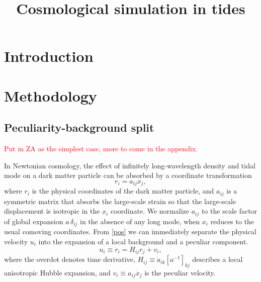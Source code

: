 \documentclass[a4paper,11pt]{article}
\title{Cosmological simulation in tides}
\newcommand{\HL}[1]{\textcolor{red}{#1}} %
\begin{document}
\maketitle

\section{Introduction}
\label{sec:intro}


\section{Methodology}
\label{sec:methodology}

\subsection{Peculiarity-background split}
\label{sub:split}

\HL{Put in ZA as the simplest case, more to come in the appendix.}

In Newtonian cosmology, the effect of infinitely long-wavelength density and
tidal mode on a dark matter particle can be absorbed by a coordinate
transformation
\begin{equation}
    r_i = a_{ij} x_j,
    \label{pos}
\end{equation}
where $r_i$ is the physical coordinates of the dark matter particle, and
$a_{ij}$ is a symmetric matrix that absorbs the large-scale strain so that the
large-scale displacement is isotropic in the $x_i$ coordinate.
We normalize $a_{ij}$ to the scale factor of global expansion $a\,\delta_{ij}$
in the absence of any long mode, when $x_i$ reduces to the usual comoving
coordinates.
From \eqref{pos} we can immediately separate the physical velocity $u_i$ into
the expansion of a local background and a peculiar component.
\begin{equation}
    u_i \equiv \dot r_i = H_{ij} r_j + v_i,
    \label{vel}
\end{equation}
where the overdot denotes time derivative, $H_{ij} \equiv \dot a_{ik}
[a^{-1}]_{kj}$ describes a local anisotropic Hubble expansion, and $v_i\equiv
a_{ij}\dot x_j$ is the peculiar velocity.
\end{document}
